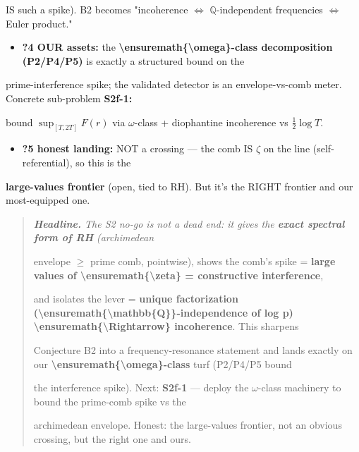 \documentclass[10pt]{article}
\begin{document}
  IS such a spike). B2 becomes "incoherence \ensuremath{\iff} \ensuremath{\mathbb{Q}}-independent frequencies \ensuremath{\iff} Euler product."\par
\begin{itemize}
\item \textbf{?4 OUR assets:} the \textbf{\textbackslash{}ensuremath\{\textbackslash{}omega\}-class decomposition (P2/P4/P5)} is exactly a structured bound on the
\end{itemize}
  prime-interference spike; the validated detector is an envelope-vs-comb meter. Concrete sub-problem \textbf{S2f-1:}\par
  bound $\sup_{[T,2T]}F(r)$ via \ensuremath{\omega}-class + diophantine incoherence vs $\tfrac12\log T$.\par
\begin{itemize}
\item \textbf{?5 honest landing:} NOT a crossing --- the comb IS \ensuremath{\zeta} on the line (self-referential), so this is the
\end{itemize}
  \textbf{large-values frontier} (open, tied to RH). But it's the RIGHT frontier and our most-equipped one.\par

\begin{quote}\itshape
\textbf{Headline.} The S2 no-go is not a dead end: it gives the \textbf{exact spectral form of RH} (archimedean\par
envelope \ensuremath{\ge} prime comb, pointwise), shows the comb's spike = \textbf{large values of \textbackslash{}ensuremath\{\textbackslash{}zeta\} = constructive interference},\par
and isolates the lever = \textbf{unique factorization (\textbackslash{}ensuremath\{\textbackslash{}mathbb\{Q\}\}-independence of log p) \textbackslash{}ensuremath\{\textbackslash{}Rightarrow\} incoherence}. This sharpens\par
Conjecture B2 into a frequency-resonance statement and lands exactly on our \textbf{\textbackslash{}ensuremath\{\textbackslash{}omega\}-class} turf (P2/P4/P5 bound\par
the interference spike). Next: \textbf{S2f-1} --- deploy the \ensuremath{\omega}-class machinery to bound the prime-comb spike vs the\par
archimedean envelope. Honest: the large-values frontier, not an obvious crossing, but the right one and ours.\par
\end{quote}
\end{document}
